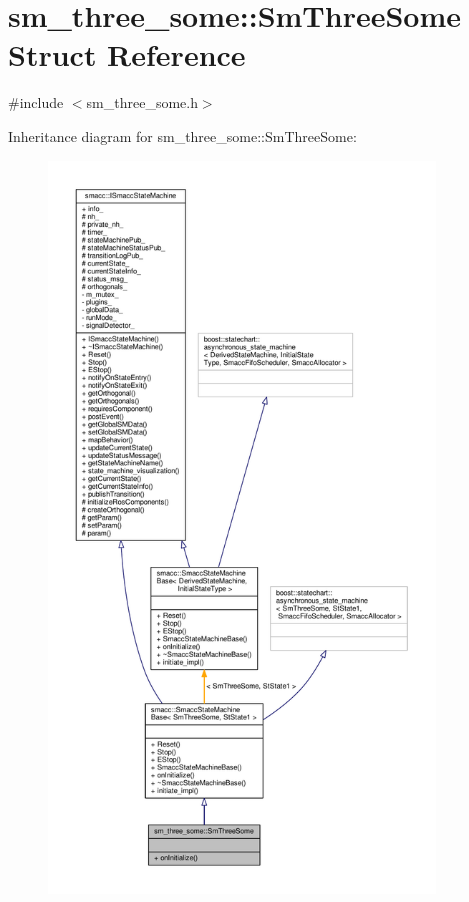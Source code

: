 \hypertarget{structsm__three__some_1_1SmThreeSome}{}\section{sm\+\_\+three\+\_\+some\+:\+:Sm\+Three\+Some Struct Reference}
\label{structsm__three__some_1_1SmThreeSome}


{\ttfamily \#include $<$sm\+\_\+three\+\_\+some.\+h$>$}



Inheritance diagram for sm\+\_\+three\+\_\+some\+:\+:Sm\+Three\+Some\+:
\nopagebreak
\begin{figure}[H]
\begin{center}
\leavevmode
\includegraphics[height=550pt]{structsm__three__some_1_1SmThreeSome__inherit__graph}
\end{center}
\end{figure}


